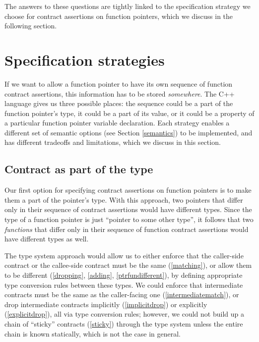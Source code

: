 The answers to these questions are tightly linked to the specification strategy we choose for contract assertions on function pointers, which we discuss in the following section.

\section{Specification strategies}
\label{wherelive}


If we want to allow a function pointer to have its own sequence of function contract assertions, this information has to be stored \emph{somewhere}. The C++ language gives us three possible places: the sequence could be a part of the function pointer's type, it could be a part of its value, or it could be a property of a particular function pointer variable declaration. Each strategy enables a different set of semantic options (see Section \ref{semantics}) to be implemented, and has different tradeoffs and limitations, which we discuss in this section.

\subsection{Contract as part of the type}
\label{type}

Our first option for specifying contract assertions on function pointers is to make them a part of the pointer's type. With this approach, two pointers that differ only in their sequence of contract assertions would have different types. Since the type of a function pointer is just ``pointer to some other type'', it follows that two \emph{functions} that differ only in their sequence of function contract assertions would have different types as well.

The type system approach would allow us to either enforce that the caller-side contract or the callee-side contract must be the same (\ref{matching}), or allow them to be different (\ref{dropping}, \ref{adding}, \ref{ptrfundifferent}), by defining appropriate type conversion rules between these types. We could enforce that intermediate contracts must be the same as the caller-facing one (\ref{intermediatematch}), or drop intermediate contracts implicitly (\ref{implicitdrop}) or explicitly (\ref{explicitdrop}), all via type conversion rules; however, we could not build up a chain of ``sticky'' contracts (\ref{sticky}) through the type system unless the entire chain is known statically, which is not the case in general. 

